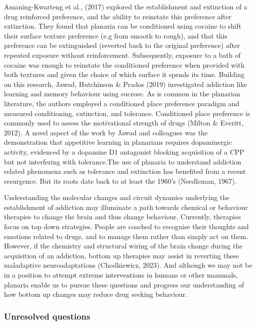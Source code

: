 \documentclass[
  letterpaper,
  DIV=11,
  numbers=noendperiod,
  oneside]{scrartcl}
\begin{document}
Amaning-Kwarteng et al., (2017) explored the establishment and
extinction of a drug reinforced preference, and the ability to reinstate
this preference after extinction. They found that planaria can be
conditioned using cocaine to shift their surface texture preference (e.g
from smooth to rough), and that this preference can be extinguished
(reverted back to the original preference) after repeated exposure
without reinforcement. Subsequently, exposure to a bath of cocaine was
enough to reinstate the conditioned preference when provided with both
textures and given the choice of which surface it spends its time.
Building on this research, Jawad, Hutchinson \& Prados (2019)
investigated addiction like learning and memory behaviour using sucrose.
As is common in the planarian literature, the authors employed a
conditioned place preference paradigm and measured conditioning,
extinction, and tolerance. Conditioned place preference is commonly used
to assess the motivational strength of drugs (Milton \& Everitt, 2012).
A novel aspect of the work by Jawad and colleagues was the demonstration
that appetitive learning in planarians requires dopaminergic activity,
evidenced by a dopamine D1 antagonist blocking acquisition of a CPP but
not interfering with tolerance.The use of planaria to understand
addiction related phenomena such as tolerance and extinction has
benefited from a recent resurgence. But its roots date back to at least
the 1960's (Needleman, 1967).

Understanding the molecular changes and circuit dynamics underlying the
establishment of addiction may illuminate a path towards chemical or
behaviour therapies to change the brain and thus change behaviour.
Currently, therapies focus on top down strategies. People are coached to
recognise their thoughts and emotions related to drugs, and to manage
them rather than simply act on them. However, if the chemistry and
structural wiring of the brain change during the acquisition of an
addiction, bottom up therapies may assist in reverting these maladaptive
neuroadaptations (Chodkiewicz, 2023). And although we may not be in a
position to attempt extreme interventions in humans or other mammals,
planaria enable us to pursue these questions and progress our
understanding of how bottom up changes may reduce drug seeking
behaviour.

\subsubsection{Unresolved questions}\label{unresolved-questions}
\end{document}
